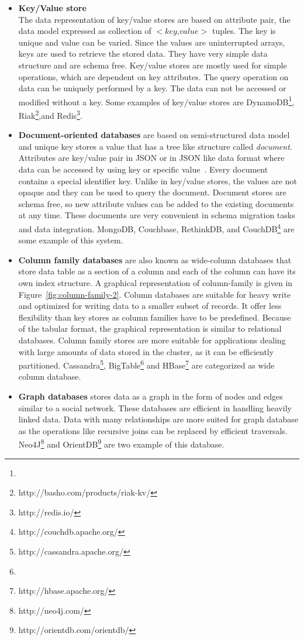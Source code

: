 	\begin{itemize}
		\item 
			\textbf{Key/Value store}\\ The data representation of key/value stores are based on attribute pair, the data model expressed as collection of $<$$key$,$value$$>$ tuples. The key is unique and value can be varied. Since the values are uninterrupted arrays, keys are used to retrieve the stored data. They have very simple data structure and are schema free. Key/value stores are mostly used for simple operations, which are dependent on key attributes. The query operation on data can be uniquely performed by a key. The data can not be accessed or modified without a key. Some examples of key/value stores are DynamoDB\footnote{}, Riak\footnote{http://basho.com/products/riak-kv/},and Redis\footnote{http://redis.io/}.
		\item 
			\textbf{Document-oriented databases} are based on semi-structured data model and unique key stores a value that has a tree like structure called \textit{document}. Attributes are key/value pair in JSON or in JSON like data format where data can be accessed by using key or specific value~\citep{hecht2011nosql}. Every document contains a special identifier key. Unlike in key/value stores, the values are not opaque and  they can be used to query the document. Document stores are schema free, so new attribute values can be added to the existing documents at any time. These documents are very convenient in schema migration tasks and data integration.  MongoDB, Couchbase, RethinkDB, and CouchDB\footnote{http://couchdb.apache.org/} are some example of this system.
		\item 
			\textbf{Column family databases} are also known as wide-column databases that store data table as a section of a column and each of the column can have  its own index structure. A graphical representation of column-family is given in  Figure~\ref{fig:column-family-2}. Column databases are suitable for heavy write and optimized for writing data to a smaller subset of records. It offer less flexibility than key stores as column families have to be predefined. Because of the tabular format, the graphical representation is similar to relational databases. Column family stores are more suitable for applications dealing with large amounts of data stored in the cluster, as it can be efficiently partitioned.  Cassandra\footnote{http://cassandra.apache.org/}, BigTable\footnote{} and HBase\footnote{http://hbase.apache.org/} are categorized as wide column database.
		\item 
			\textbf{Graph databases} stores data as a  graph in the form of nodes and edges similar to a social network. These databases are efficient in handling heavily linked data. Data with many relationships are more suited for graph database as the operations like recursive joins can be replaced by efficient traversals. Neo4J\footnote{http://neo4j.com/} and OrientDB\footnote{http://orientdb.com/orientdb/} are two example of this database.
	\end{itemize}
	
